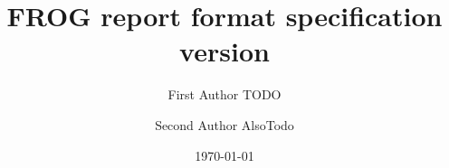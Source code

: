 \title{FROG report format specification \\ version \frogspecversion}
\author[1]{First Author TODO}
\author[2]{Second Author AlsoTodo}
\date{\today}
